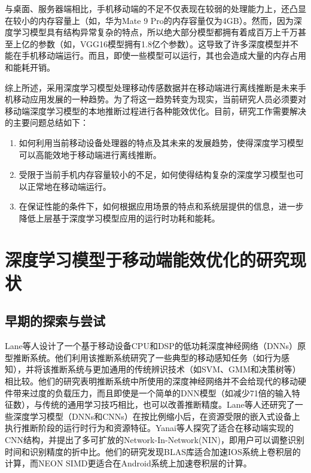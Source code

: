 与桌面、服务器端相比，手机移动端的不足不仅表现在较弱的处理能力上，还凸显在较小的内存容量上（如，华为Mate 9 Pro的内存容量仅为4GB）。然而，因为深度学习模型具有结构异常复杂的特点，所以绝大部分模型都拥有着成百万上千万甚至上亿的参数（如，VGG16\cite{simonyan2014very}模型拥有1.8亿个参数）。这导致了许多深度模型并不能在手机移动端运行。而且，即使一些模型可以运行，其也会造成大量的内存占用和能耗开销。

综上所述，采用深度学习模型处理移动传感数据并在移动端进行离线推断是未来手机移动应用发展的一种趋势。为了将这一趋势转变为现实，当前研究人员必须要对移动端深度学习模型的本地推断过程进行各种能效优化。目前，研究工作需要解决的主要问题总结如下：

\begin{enumerate}
\item  如何利用当前移动设备处理器的特点及其未来的发展趋势，使得深度学习模型可以高能效地于移动端进行离线推断。
\item 受限于当前手机内存容量较小的不足，如何使得结构复杂的深度学习模型也可以正常地在移动端运行。
\item 在保证性能的条件下，如何根据应用场景的特点和系统层提供的信息，进一步降低上层基于深度学习模型应用的运行时功耗和能耗。
\end{enumerate}

\section{深度学习模型于移动端能效优化的研究现状}
\subsection{早期的探索与尝试}
Lane等人\cite{lane2015can}设计了一个基于移动设备CPU和DSP的低功耗深度神经网络（DNNs）\cite{deng2013new}原型推断系统。他们利用该推断系统研究了一些典型的移动感知任务（如行为感知），并将该推断系统与更加通用的传统辨识技术（如SVM、GMM和决策树等）相比较。他们的研究表明推断系统中所使用的深度神经网络并不会给现代的移动硬件带来过度的负载压力，而且即使是一个简单的DNN模型（如减少71倍的输入特征数），与传统的通用学习技巧相比，也可以改善推断精度。Lane等人\cite{lane2015early}还研究了一些深度学习模型（DNNs和CNNs）在按比例缩小后，在资源受限的嵌入式设备上执行推断阶段的运行时行为和资源特征。Yanai等人\cite{yanai2016efficient}探究了适合在移动端实现的CNN结构，并提出了多可扩放的Network-In-Network(NIN)\cite{lin2013network}，即用户可以调整识别时间和识别精度的折中比。他们的研究发现BLAS库适合加速IOS系统上卷积层的计算，而NEON SIMD\cite{mitra2013use}更适合在Android系统上加速卷积层的计算。
